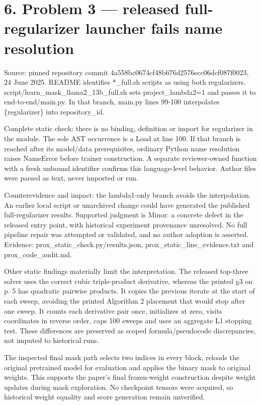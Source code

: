 \documentclass[10pt]{article}
\begin{document}
\section*{6. Problem 3 — released full-regularizer launcher fails name resolution}
Source: pinned repository commit 4a558bc0674cf48b676d2576ecc06dcf087f0023, 24 June 2025. README identifies *\_full.sh scripts as using both regularizers. script/learn\_mask\_llama2\_13b\_full.sh sets project\_lambda2=1 and passes it to end-to-end/main.py. In that branch, main.py lines 99-100 interpolates \{regularizer\} into repository\_id.\par
Complete static check: there is no binding, definition or import for regularizer in the module. The sole AST occurrence is a Load at line 100. If that branch is reached after its model/data prerequisites, ordinary Python name resolution raises NameError before trainer construction. A separate reviewer-owned function with a fresh unbound identifier confirms this language-level behavior. Author files were parsed as text, never imported or run.\par
Counterevidence and impact: the lambda1-only branch avoids the interpolation. An earlier local script or unarchived change could have generated the published full-regularizer results. Supported judgment is Minor: a concrete defect in the released entry point, with historical experiment provenance unresolved. No full pipeline repair was attempted or validated, and no author adoption is asserted. Evidence: prox\_static\_check.py/results.json, prox\_static\_line\_evidence.txt and prox\_code\_audit.md.\par
Other static findings materially limit the interpretation. The released top-three solver uses the correct cubic triple-product derivative, whereas the printed g3 on p. 5 has quadratic pairwise products. It copies the previous iterate at the start of each sweep, avoiding the printed Algorithm 2 placement that would stop after one sweep. It counts each derivative pair once, initializes at zero, visits coordinates in reverse order, caps 100 sweeps and uses an aggregate L1 stopping test. These differences are preserved as scoped formula/pseudocode discrepancies, not imputed to historical runs.\par
The inspected final mask path selects two indices in every block, reloads the original pretrained model for evaluation and applies the binary mask to original weights. This supports the paper’s final frozen-weight construction despite weight updates during mask exploration. No checkpoint tensors were acquired, so historical weight equality and score generation remain unverified.\par
\end{document}
